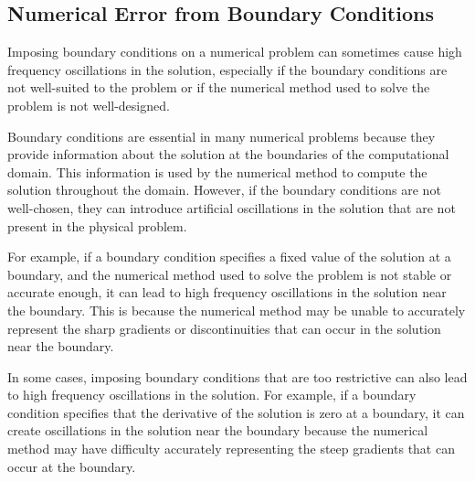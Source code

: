 \documentclass[a4paper]{report}
\begin{document}
\subsection{Numerical Error from Boundary Conditions} 

Imposing boundary conditions on a numerical problem can sometimes cause high 
frequency oscillations in the solution, especially if the boundary conditions are 
not well-suited to the problem or if the numerical method 
used to solve the problem is not well-designed.

Boundary conditions are essential in many numerical problems because they provide
information about the solution at the boundaries of the computational domain. 
This information is used by the numerical method to compute the solution throughout 
the domain. However, if the boundary conditions are not well-chosen, they 
can introduce artificial oscillations in the solution that are not present in 
the physical problem.

For example, if a boundary condition specifies a fixed value of the solution 
at a boundary, and the numerical method used to solve the problem is not 
stable or accurate enough, it can lead to high frequency oscillations in the 
solution near the boundary. This is because the numerical method may be unable 
to accurately represent the sharp gradients or discontinuities that can occur 
in the solution near the boundary.

In some cases, imposing boundary conditions that are too restrictive can also 
lead to high frequency oscillations in the solution. For example, 
if a boundary condition specifies that the derivative of the solution is zero at a boundary, 
it can create oscillations in the solution near the boundary because 
the numerical method may have difficulty accurately representing 
the steep gradients that can occur at the boundary.
\end{document}
